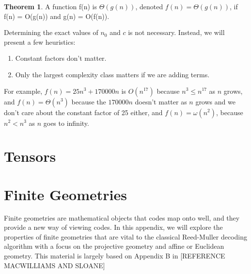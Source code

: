 \documentclass[12pt,twoside]{reedthesis}
\theoremstyle{definition}
\newtheorem{theorem}{Theorem}[chapter]
\begin{document}
\begin{theorem}
A function f(n) is $\Theta(g(n))$, denoted $f(n) = \Theta(g(n))$, if f(n) = O(g(n)) and g(n) = O(f(n)).
\end{theorem}

Determining the exact values of $n_0$ and $c$ is not necessary. Instead, we will present a few heuristics:
\begin{enumerate}
\item Constant factors don't matter. 
\item Only the largest complexity class matters if we are adding terms.
\end{enumerate}
For example, $f(n)= 25n^3 + 170000n$ is $O(n^{17})$ because $n^3 \leq n^{17} $ as $n$ grows, and $f(n) = \Theta(n^3)$ because the $170000n$ doesn't matter as $n$ grows and we don't care about the constant factor of 25 either, and $f(n) = \omega(n^2)$, because $n^2 < n^3$ as $n$ goes to infinity.

	
\chapter{Tensors}
\chapter{Finite Geometries} \label{finite_geom_chapter}
Finite geometries are mathematical objects that codes map onto well, and they provide a new way of viewing codes. In this appendix, we will explore the properties of finite geometries that are vital to the classical Reed-Muller decoding algorithm with a focus on the projective geometry and affine or Euclidean geometry. This material is largely based on Appendix B in [REFERENCE MACWILLIAMS AND SLOANE]
\end{document}
